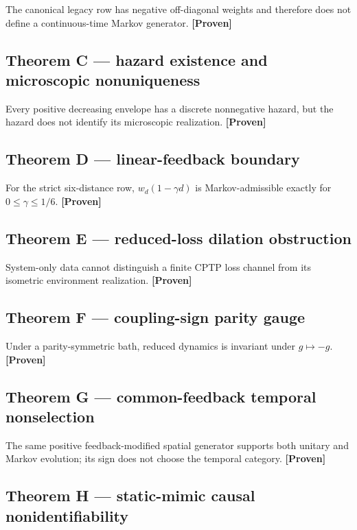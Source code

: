 \documentclass[11pt,a4paper,openany]{report}
\newcommand{\statusProven}{\textcolor{fingreen}{[Proven]}}
\begin{document}
The canonical legacy row has negative off-diagonal weights and therefore does not define a continuous-time Markov generator. \textbf{\statusProven{}}

\subsection{Theorem C — hazard existence and microscopic nonuniqueness}

Every positive decreasing envelope has a discrete nonnegative hazard, but the hazard does not identify its microscopic realization. \textbf{\statusProven{}}

\subsection{Theorem D — linear-feedback boundary}

For the strict six-distance row, \(w_d(1-\gamma d)\) is Markov-admissible exactly for \(0\le\gamma\le1/6\). \textbf{\statusProven{}}

\subsection{Theorem E — reduced-loss dilation obstruction}

System-only data cannot distinguish a finite CPTP loss channel from its isometric environment realization. \textbf{\statusProven{}}

\subsection{Theorem F — coupling-sign parity gauge}

Under a parity-symmetric bath, reduced dynamics is invariant under \(g\mapsto-g\). \textbf{\statusProven{}}

\subsection{Theorem G — common-feedback temporal nonselection}

The same positive feedback-modified spatial generator supports both unitary and Markov evolution; its sign does not choose the temporal category. \textbf{\statusProven{}}

\subsection{Theorem H — static-mimic causal nonidentifiability}
\end{document}
